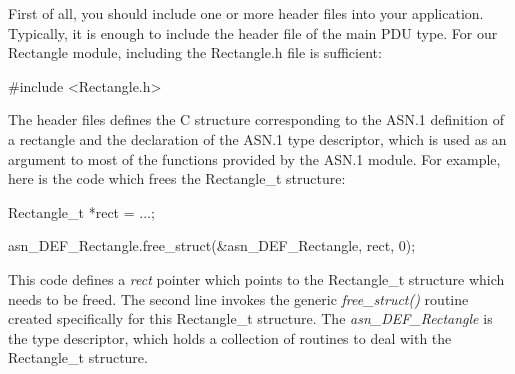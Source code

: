 \documentclass[english,oneside,12pt]{book}
\begin{document}
First of all, you should include one or more header files into your
application. Typically, it is enough to include the header file of
the main PDU type. For our Rectangle module, including the Rectangle.h
file is sufficient:
\begin{codesample}
#include <Rectangle.h>
\end{codesample}
The header files defines the C structure corresponding to the ASN.1
definition of a rectangle and the declaration of the ASN.1 type descriptor,
which is used as an argument to most of the functions provided by
the ASN.1 module. For example, here is the code which frees the Rectangle\_t
structure:
\begin{codesample}
Rectangle_t *rect = ...;

asn_DEF_Rectangle.free_struct(&asn_DEF_Rectangle, rect, 0);
\end{codesample}
This code defines a \emph{rect} pointer which points to the Rectangle\_t
structure which needs to be freed. The second line invokes the generic
\emph{free\_struct()} routine created specifically for this Rectangle\_t
structure. The \emph{asn\_DEF\_Rectangle} is the type descriptor,
which holds a collection of routines to deal with the Rectangle\_t
structure.
\end{document}
